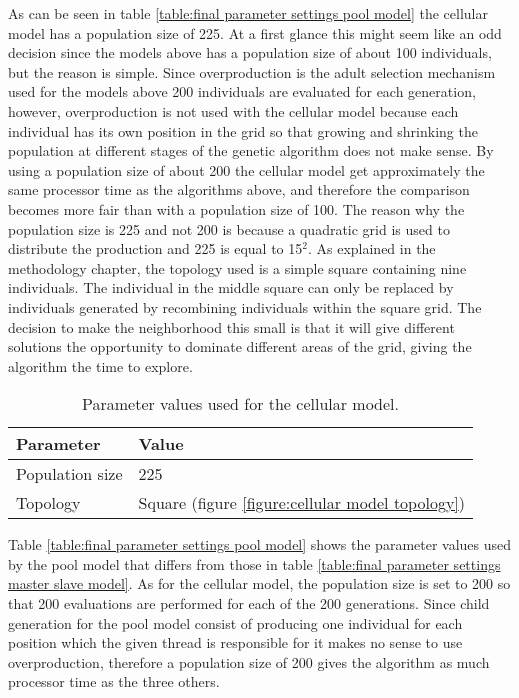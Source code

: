 \noindent As can be seen in table \ref{table:final parameter settings pool model} the cellular model has a population size of 225. At a first glance this might seem like an odd decision since the models above has a population size of about 100 individuals, but the reason is simple. Since overproduction is the adult selection mechanism used for the models above 200 individuals are evaluated for each generation, however, overproduction is not used with the cellular model because each individual has its own position in the grid so that growing and shrinking the population at different stages of the genetic algorithm does not make sense. By using a population size of about 200 the cellular model get approximately the same processor time as the algorithms above, and therefore the comparison becomes more fair than with a population size of 100. The reason why the population size is 225 and not 200 is because a quadratic grid is used to distribute the production and 225 is equal to 15$^{2}$. As explained in the methodology chapter, the topology used is a simple square containing nine individuals. The individual in the middle square can only be replaced by individuals generated by recombining individuals within the square grid. The decision to make the neighborhood this small is that it will give different solutions the opportunity to dominate different areas of the grid, giving the algorithm the time to explore.\\


\begin{table}
\centering
\caption{Parameter values used for the cellular model.}
\label{table:final parameter settings cellular model}
\begin{tabular}{l|l}
\textbf{Parameter} & \textbf{Value} \\ 
\hline 
Population size & 225 \\
Topology & Square (figure \ref{figure:cellular model topology}) \\  
\end{tabular}
\end{table}



\noindent Table \ref{table:final parameter settings pool model} shows the parameter values used by the pool model that differs from those in table \ref{table:final parameter settings master slave model}. As for the cellular model, the population size is set to 200 so that 200 evaluations are performed for each of the 200 generations. Since child generation for the pool model consist of producing one individual for each position which the given thread is responsible for it makes no sense to use overproduction, therefore a population size of 200 gives the algorithm as much processor time as the three others.\\


